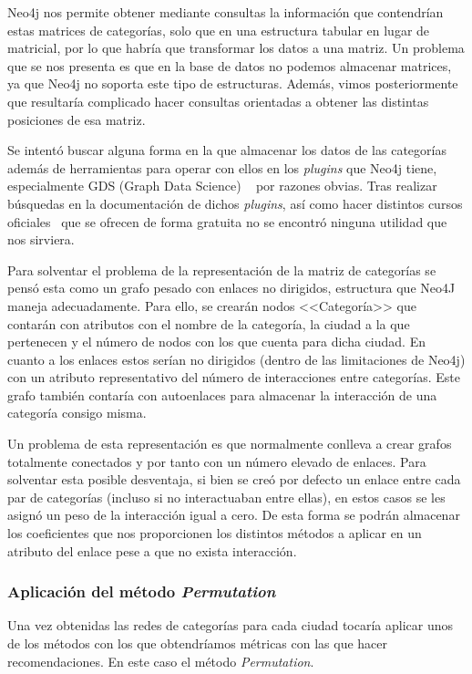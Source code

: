 
Neo4j nos permite obtener mediante consultas la información que contendrían estas matrices de categorías, solo que en una estructura tabular en lugar de matricial, por lo que habría que transformar los datos a una matriz. Un problema que se nos presenta es que en la base de datos no podemos almacenar matrices, ya que Neo4j no soporta este tipo de estructuras. Además, vimos posteriormente que resultaría complicado hacer consultas orientadas a obtener las distintas posiciones de esa matriz.

Se intentó buscar alguna forma en la que almacenar los datos de las categorías además de herramientas para operar con ellos en los \textit{plugins} que Neo4j tiene, especialmente GDS (Graph Data Science) ~\cite{GDS} por razones obvias. Tras realizar búsquedas en la documentación de dichos \textit{plugins}, así como hacer distintos cursos oficiales~\cite{neo4jGDScourse} que se ofrecen de forma gratuita no se encontró ninguna utilidad que nos sirviera.

Para solventar el problema de la representación de la matriz de categorías se pensó esta como un grafo pesado con enlaces no dirigidos, estructura que Neo4J maneja adecuadamente. Para ello, se crearán nodos <<Categoría>> que contarán con atributos con el nombre de la categoría, la ciudad a la que pertenecen y el número de nodos con los que cuenta para dicha ciudad. En cuanto a los enlaces estos serían no dirigidos (dentro de las limitaciones de Neo4j) con un atributo representativo del número de interacciones entre categorías. Este grafo también contaría con autoenlaces para almacenar la interacción de una categoría consigo misma. 


Un problema de esta representación es que normalmente conlleva a crear grafos totalmente conectados y por tanto con un número elevado de enlaces. Para solventar esta posible desventaja, si bien se creó por defecto un enlace entre cada par de categorías (incluso si no interactuaban entre ellas), en estos casos se les asignó un peso de la interacción igual a cero. De esta forma se podrán almacenar los coeficientes que nos proporcionen los distintos métodos a aplicar en un atributo del enlace pese a que no exista interacción.

\subsubsection{Aplicación del método \textit{Permutation}}
Una vez obtenidas las redes de categorías para cada ciudad tocaría aplicar unos de los métodos con los que obtendríamos métricas con las que hacer recomendaciones. En este caso el método \textit{Permutation}.

